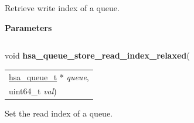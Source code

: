 \documentclass[final]{book}
\newcommand{\hsaarg}[1]{\textit{#1}}
\begin{document}
\begin{appendices}
\noindent\begin{longtable}{@{}>{\hangindent=2em}p{\linewidth}}

\end{longtable}
 


\noindent{}
Retrieve write index of a queue.

\noindent\textbf{Parameters}\\[-6mm]
\noindent\begin{longtable}{@{}>{\hangindent=2em}p{\textwidth}}
\hsaarg{queue}\\\hspace{2em}(in) Queue.
\end{longtable}
\vspace{-5mm}\noindent\textbf{Returns}\\[1mm]
Write index.

\noindent\begin{longtable}{@{}>{\hangindent=2em}p{\linewidth}}

\end{longtable}
 


\noindent\begin{tcolorbox}[breakable,nobeforeafter,colframe=white,colback=lightgray,left=0mm]
void \hypertarget{group--queue-1ga87a8eda87748cf23a30d1dd963b259ca}{\textbf{hsa_queue_store_read_index_relaxed}}(
\vspace{-3.5mm}\begin{longtable}{@{}p{\textwidth}}
\hspace{1.7em}\hyperlink{group--queue-1gacbb2835331f18aee30ee441f07b3fc5a}{hsa_queue_t} * \hsaarg{queue},\\
\hspace{1.7em}uint64_t \hsaarg{val})\end{longtable}

\end{tcolorbox}
Set the read index of a queue.


\end{appendices}
\end{document}
